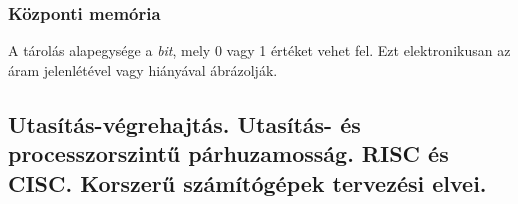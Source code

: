 \documentclass{article}
\begin{document}
\subsubsection{Központi memória}

A tárolás alapegysége a \emph{bit}, mely 0 vagy 1 értéket vehet fel. Ezt elektronikusan az áram jelenlétével vagy hiányával ábrázolják.

\subsection{Utasítás-végrehajtás. Utasítás- és processzorszintű párhuzamosság. RISC és CISC. Korszerű számítógépek tervezési elvei.}




\end{document}
